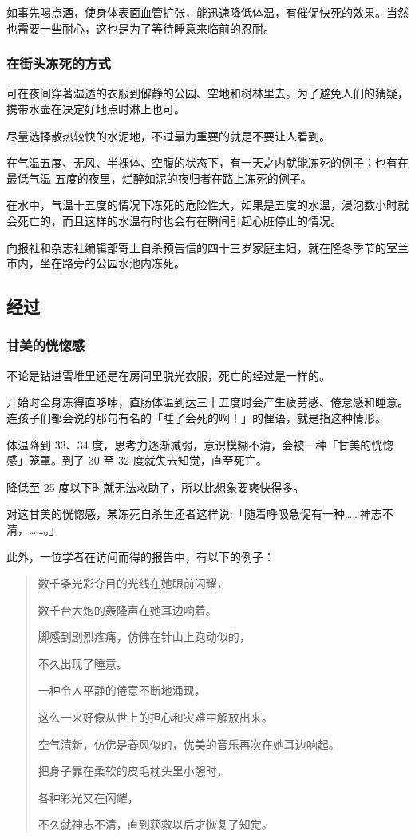 \documentclass[UTF8]{ctexart}
\begin{document}
如事先喝点酒，使身体表面血管扩张，能迅速降低体温，有催促快死的效果。当然也需要一些耐心，这也是为了等待睡意来临前的忍耐。


\subsubsection*{在街头冻死的方式}

可在夜间穿著湿透的衣服到僻静的公园、空地和树林里去。为了避免人们的猜疑，携带水壶在决定好地点时淋上也可。

尽量选择散热较快的水泥地，不过最为重要的就是不要让人看到。 

在气温五度、无风、半裸体、空腹的状态下，有一天之内就能冻死的例子；也有在最低气温 五度的夜里，烂醉如泥的夜归者在路上冻死的例子。

在水中，气温十五度的情况下冻死的危险性大，如果是五度的水温，浸泡数小时就会死亡的，而且这样的水温有时也会有在瞬间引起心脏停止的情况。

向报社和杂志社编辑部寄上自杀预告信的四十三岁家庭主妇，就在隆冬季节的室兰市内，坐在路旁的公园水池内冻死。

\subsection{经过}

\subsubsection*{甘美的恍惚感}

不论是钻进雪堆里还是在房间里脱光衣服，死亡的经过是一样的。

开始时全身冻得直哆嗦，直肠体温到达三十五度时会产生疲劳感、倦怠感和睡意。连孩子们都会说的那句有名的「睡了会死的啊！」的俚语，就是指这种情形。

体温降到 33、34 度，思考力逐渐减弱，意识模糊不清，会被一种「甘美的恍惚感」笼罩。到了 30 至 32 度就失去知觉，直至死亡。

降低至 25 度以下时就无法救助了，所以比想象要爽快得多。

对这甘美的恍惚感，某冻死自杀生还者这样说:「随着呼吸急促有一种……神志不清，……。」

此外，一位学者在访问而得的报告中，有以下的例子：

\begin{quote}
数千条光彩夺目的光线在她眼前闪耀，

数千台大炮的轰隆声在她耳边响着。

脚感到剧烈疼痛，仿佛在针山上跑动似的，

不久出现了睡意。

一种令人平静的倦意不断地涌现，

这么一来好像从世上的担心和灾难中解放出来。

空气清新，仿佛是春风似的，优美的音乐再次在她耳边响起。

把身子靠在柔软的皮毛枕头里小憩时，

各种彩光又在闪耀，

不久就神志不清，直到获救以后才恢复了知觉。
\end{quote}
\end{document}
